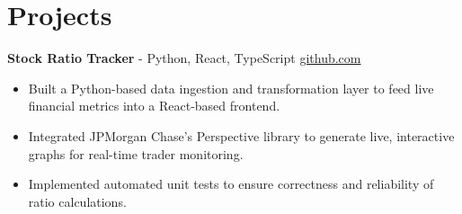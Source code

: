 \documentclass[11pt]{article}       %
\begin{document}
\vspace{-18.5pt}

\section*{Projects}

\textbf{Stock Ratio Tracker}{ - Python, React, TypeScript} \hfill \href{https://github.com/Monica20030707/Trading-Dashboard_UI}{github.com} \\
\vspace{-9pt}
\begin{itemize}
  \item Built a Python-based data ingestion and transformation layer to feed live financial metrics into a React-based frontend.
  \item Integrated JPMorgan Chase's Perspective library to generate live, interactive graphs for real-time trader monitoring.
  \item Implemented automated unit tests to ensure correctness and reliability of ratio calculations.
\end{itemize}

\end{document}
